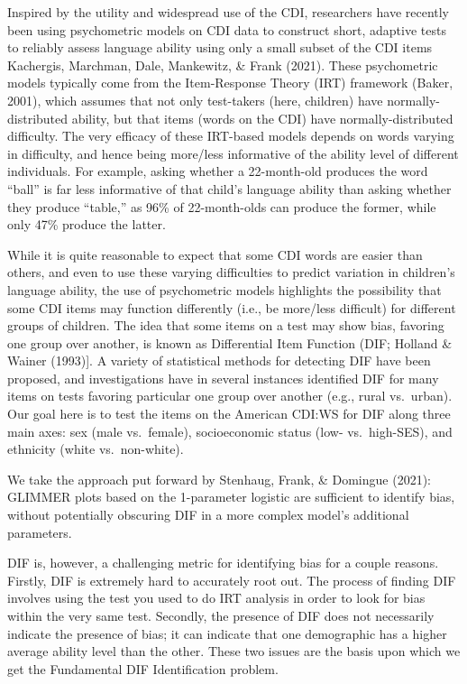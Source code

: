\documentclass[10pt, letterpaper]{article}
\begin{document}
Inspired by the utility and widespread use of the CDI, researchers have
recently been using psychometric models on CDI data to construct short,
adaptive tests to reliably assess language ability using only a small
subset of the CDI items Kachergis, Marchman, Dale, Mankewitz, \& Frank
(2021). These psychometric models typically come from the Item-Response
Theory (IRT) framework (Baker, 2001), which assumes that not only
test-takers (here, children) have normally-distributed ability, but that
items (words on the CDI) have normally-distributed difficulty. The very
efficacy of these IRT-based models depends on words varying in
difficulty, and hence being more/less informative of the ability level
of different individuals. For example, asking whether a 22-month-old
produces the word ``ball'' is far less informative of that child's
language ability than asking whether they produce ``table,'' as 96\% of
22-month-olds can produce the former, while only 47\% produce the
latter.

While it is quite reasonable to expect that some CDI words are easier
than others, and even to use these varying difficulties to predict
variation in children's language ability, the use of psychometric models
highlights the possibility that some CDI items may function differently
(i.e., be more/less difficult) for different groups of children. The
idea that some items on a test may show bias, favoring one group over
another, is known as Differential Item Function (DIF; Holland \& Wainer
(1993){]}. A variety of statistical methods for detecting DIF have been
proposed, and investigations have in several instances identified DIF
for many items on tests favoring particular one group over another
(e.g., rural vs.~urban). Our goal here is to test the items on the
American CDI:WS for DIF along three main axes: sex (male vs.~female),
socioeconomic status (low- vs.~high-SES), and ethnicity (white
vs.~non-white).

We take the approach put forward by Stenhaug, Frank, \& Domingue (2021):
GLIMMER plots based on the 1-parameter logistic are sufficient to
identify bias, without potentially obscuring DIF in a more complex
model's additional parameters.

DIF is, however, a challenging metric for identifying bias for a couple
reasons. Firstly, DIF is extremely hard to accurately root out. The
process of finding DIF involves using the test you used to do IRT
analysis in order to look for bias within the very same test. Secondly,
the presence of DIF does not necessarily indicate the presence of bias;
it can indicate that one demographic has a higher average ability level
than the other. These two issues are the basis upon which we get the
Fundamental DIF Identification problem.
\end{document}
